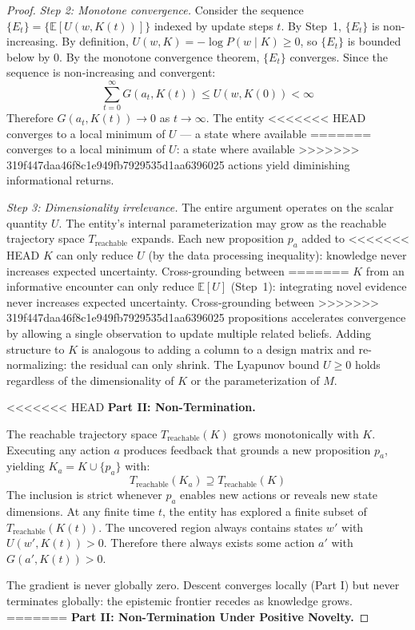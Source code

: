\documentclass[11pt]{article}
\theoremstyle{definition}
\begin{document}
\begin{proof}
\emph{Step 2: Monotone convergence.} Consider the sequence
$\{E_t\} = \{\mathbb{E}[U(w, K(t))]\}$ indexed by update steps $t$.
By Step~1, $\{E_t\}$ is non-increasing. By definition, $U(w, K) =
-\log P(w \mid K) \geq 0$, so $\{E_t\}$ is bounded below by $0$. By
the monotone convergence theorem, $\{E_t\}$ converges. Since the
sequence is non-increasing and convergent:
\[
\sum_{t=0}^{\infty} G(a_t, K(t)) \leq U(w, K(0)) < \infty
\]
Therefore $G(a_t, K(t)) \to 0$ as $t \to \infty$. The entity
<<<<<<< HEAD
converges to a local minimum of $U$ --- a state where available
=======
converges to a local minimum of $U$: a state where available
>>>>>>> 319f447daa46f8c1e949fb7929535d1aa6396025
actions yield diminishing informational returns.

\emph{Step 3: Dimensionality irrelevance.} The entire argument
operates on the scalar quantity $U$. The entity's internal
parameterization may grow as the reachable trajectory space
$T_{\mathrm{reachable}}$ expands. Each new proposition $p_a$ added to
<<<<<<< HEAD
$K$ can only reduce $U$ (by the data processing inequality): knowledge
never increases expected uncertainty. Cross-grounding between
=======
$K$ from an informative encounter can only reduce $\mathbb{E}[U]$
(Step~1): integrating novel evidence never increases expected
uncertainty. Cross-grounding between
>>>>>>> 319f447daa46f8c1e949fb7929535d1aa6396025
propositions accelerates convergence by allowing a single observation
to update multiple related beliefs. Adding structure to $K$ is
analogous to adding a column to a design matrix and re-normalizing:
the residual can only shrink. The Lyapunov bound $U \geq 0$ holds
regardless of the dimensionality of $K$ or the parameterization of
$M$.

<<<<<<< HEAD
\textbf{Part II: Non-Termination.}

The reachable trajectory space $T_{\mathrm{reachable}}(K)$ grows
monotonically with $K$. Executing any action $a$ produces feedback
that grounds a new proposition $p_a$, yielding $K_a = K \cup \{p_a\}$
with:
\[
T_{\mathrm{reachable}}(K_a) \supseteq T_{\mathrm{reachable}}(K)
\]
The inclusion is strict whenever $p_a$ enables new actions or reveals
new state dimensions. At any finite time $t$, the entity has explored
a finite subset of $T_{\mathrm{reachable}}(K(t))$. The uncovered
region always contains states $w'$ with $U(w', K(t)) > 0$. Therefore
there always exists some action $a'$ with $G(a', K(t)) > 0$.

The gradient is never globally zero. Descent converges locally (Part
I) but never terminates globally: the epistemic frontier recedes as
knowledge grows.
=======
\textbf{Part II: Non-Termination Under Positive Novelty.}


\end{proof}
\end{document}
